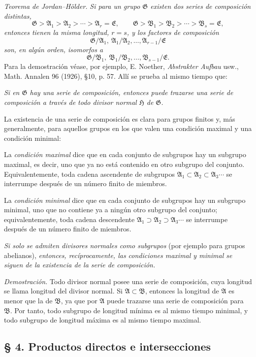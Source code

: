 \documentclass[11pt]{article}
\providecommand{\mG}{\mathfrak{G}}
\providecommand{\mA}{\mathfrak{A}}
\providecommand{\mB}{\mathfrak{B}}
\providecommand{\mE}{\mathfrak{E}}
\providecommand{\mH}{\mathfrak{H}}
\begin{document}
\emph{Teorema de Jordan--Hölder.} \emph{Si para un grupo $\mG$ existen dos series de composición distintas,}
\[
        \mG>\mA_1>\mA_2>\cdots>\mA_r=\mE,
        \qquad
        \mG>\mB_1>\mB_2>\cdots>\mB_s=\mE,
\]
\emph{entonces tienen la misma longitud, $r=s$, y los factores de composición}
\[
        \mG/\mA_1,\ \mA_1/\mA_2,\ldots,\mA_{r-1}/\mE
\]
\emph{son, en algún orden, isomorfos a}
\[
        \mG/\mB_1,\ \mB_1/\mB_2,\ldots,\mB_{s-1}/\mE.
\]
Para la demostración véase, por ejemplo, E. Noether, \emph{Abstrakter Aufbau} usw., Math. Annalen 96 (1926), §10, p. 57. Allí se prueba al mismo tiempo que:

\emph{Si en $\mG$ hay una serie de composición, entonces puede trazarse una serie de composición a través de todo divisor normal $\mH$ de $\mG$.}

La existencia de una serie de composición es clara para grupos finitos y, más generalmente, para aquellos grupos en los que valen una condición maximal y una condición minimal:

La \emph{condición maximal} dice que en cada conjunto de subgrupos hay un subgrupo maximal, es decir, uno que ya no está contenido en otro subgrupo del conjunto. Equivalentemente, toda cadena ascendente de subgrupos $\mA_1\subset\mA_2\subset\mA_3\cdots$ se interrumpe después de un número finito de miembros.

La \emph{condición minimal} dice que en cada conjunto de subgrupos hay un subgrupo minimal, uno que no contiene ya a ningún otro subgrupo del conjunto; equivalentemente, toda cadena descendente $\mA_1\supset\mA_2\supset\mA_3\cdots$ se interrumpe después de un número finito de miembros.

\emph{Si solo se admiten divisores normales como subgrupos} (por ejemplo para grupos abelianos), \emph{entonces, recíprocamente, las condiciones maximal y minimal se siguen de la existencia de la serie de composición.}

\emph{Demostración.} Todo divisor normal posee una serie de composición, cuya longitud se llama longitud del divisor normal. Si $\mA\subset\mB$, entonces la longitud de $\mA$ es menor que la de $\mB$, ya que por $\mA$ puede trazarse una serie de composición para $\mB$. Por tanto, todo subgrupo de longitud mínima es al mismo tiempo minimal, y todo subgrupo de longitud máxima es al mismo tiempo maximal.

\subsection*{§ 4. Productos directos e intersecciones}
\end{document}
